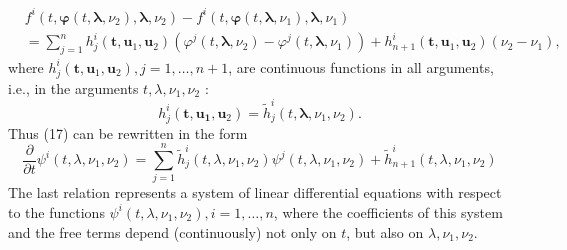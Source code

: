 \documentclass[10pt,a5paper]{book}
\makeatletter
\theoremstyle{plain}
\theoremstyle{definition}
\theoremstyle{remark}
\renewenvironment{proof}[1][\proofname]{\par
  \pushQED{\qed}%
  \normalfont\topsep6\p@\@plus6\p@\relax
  \trivlist
  \item\relax{\itshape #1\@addpunct{.}}\hspace\labelsep\ignorespaces
}{\popQED\endtrivlist\@endpefalse}
\makeatother
\begin{document}
\begin{proof}
\[\begin{aligned}
& f^{i}\left(t, \boldsymbol{\varphi}\left(t, \boldsymbol{\lambda}, \nu_{2}\right), \boldsymbol{\lambda}, \nu_{2}\right)-f^{i}\left(t, \boldsymbol{\varphi}\left(t, \boldsymbol{\lambda}, \nu_{1}\right), \boldsymbol{\lambda}, \nu_{1}\right) \\
& =\sum_{j=1}^{n} h_{j}^{i}\left(\mathbf{t}, \mathbf{u}_{1}, \mathbf{u}_{2}\right)\left(\varphi^{j}\left(t, \boldsymbol{\lambda}, \nu_{2}\right)-\varphi^{j}\left(t, \boldsymbol{\lambda}, \nu_{1}\right)\right)+h_{n+1}^{i}\left(\mathbf{t}, \mathbf{u}_{1}, \mathbf{u}_{2}\right)\left(\nu_{2}-\nu_{1}\right),
\end{aligned}
\]
where $h_{j}^{i}\left(\mathbf{t}, \mathbf{u}_{1}, \mathbf{u}_{2}\right), j=1, \ldots, n+1$, are continuous functions in all arguments, i.e., in the arguments $t, \lambda, \nu_{1}, \nu_{2}$ :
\[
h_{j}^{i}\left(\mathbf{t}, \mathbf{u}_{\mathbf{1}}, \mathbf{u}_{2}\right)=\tilde{h}_{j}^{i}\left(t, \mathbf{\lambda}, \nu_{1}, \nu_{2}\right) .
\]
Thus (17) can be rewritten in the form
\begin{equation*}
\frac{\partial}{\partial t} \psi^{i}\left(t, \lambda, \nu_{1}, \nu_{2}\right)=\sum_{j=1}^{n} \tilde{h}_{j}^{i}\left(t, \lambda, \nu_{1}, \nu_{2}\right) \psi^{j}\left(t, \lambda, \nu_{1}, \nu_{2}\right)+\tilde{h}_{n+1}^{i}\left(t, \lambda, \nu_{1}, \nu_{2}\right) \tag{18}
\end{equation*}
The last relation represents a system of linear differential equations with respect to the functions $\psi^{i}\left(t, \lambda, \nu_{1}, \nu_{2}\right), i=1, \ldots, n$, where the coefficients of this system and the free terms depend (continuously) not only on $t$, but also on $\lambda, \nu_{1}, \nu_{2}$.


\end{proof}
\end{document}
